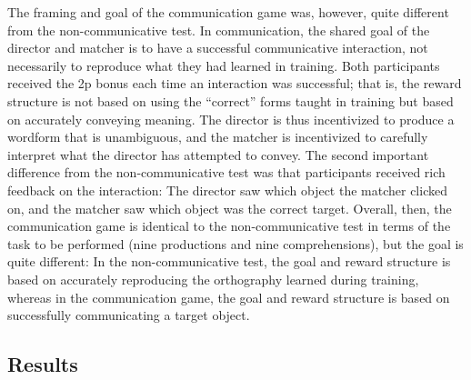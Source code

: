 \documentclass[doc,biblatex]{apa7}
\begin{document}
The framing and goal of the communication game was, however, quite different from the non-communicative test. In communication, the shared goal of the director and matcher is to have a successful communicative interaction, not necessarily to reproduce what they had learned in training. Both participants received the 2p bonus each time an interaction was successful; that is, the reward structure is not based on using the ``correct'' forms taught in training but based on accurately conveying meaning. The director is thus incentivized to produce a wordform that is unambiguous, and the matcher is incentivized to carefully interpret what the director has attempted to convey. The second important difference from the non-communicative test was that participants received rich feedback on the interaction: The director saw which object the matcher clicked on, and the matcher saw which object was the correct target. Overall, then, the communication game is identical to the non-communicative test in terms of the task to be performed (nine productions and nine comprehensions), but the goal is quite different: In the non-communicative test, the goal and reward structure is based on accurately reproducing the orthography learned during training, whereas in the communication game, the goal and reward structure is based on successfully communicating a target object.

\subsection{Results}
\end{document}
